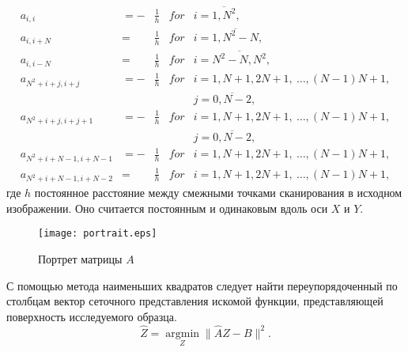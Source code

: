 \documentclass{beamer}
\begin{document}
\begin{frame}[c,allowframebreaks]
    \framebreak

    \small
    \begin{equation*}
        \begin{array}{lllll}
            a_{i,i}             & = -&\frac{1}{h} & for & i = \overline{1,N^2},                         \\
            a_{i,i+N}           & = &\frac{1}{h}  & for & i = \overline{1,N^2 - N},                     \\
            a_{i,i-N}           & = &\frac{1}{h}  & for & i = \overline{N^2 - N,N^2 },                  \\
            a_{N^2+i+j, i+j}    & = -&\frac{1}{h} & for & i = 1, N+1, 2N+1,~\dots, (N-1)N + 1,          \\
                                &   &       &   & j = \overline{0,N-2},                         \\
            a_{N^2+i+j, i+j+1}  & = -&\frac{1}{h} & for & i = 1, N+1, 2N+1,~\dots, (N-1)N + 1,          \\
                                &   &       &   & j = \overline{0,N-2},                         \\
            a_{N^2+i+N-1, i+N-1} &= -&\frac{1}{h} & for & i = 1, N+1, 2N+1,~\dots, (N-1)N + 1,          \\
            a_{N^2+i+N-1, i+N-2} &= &\frac{1}{h}  & for & i = 1, N+1, 2N+1,~\dots, (N-1)N + 1,
        \end{array}
    \end{equation*}
    где $h$ постоянное расстояние между смежными точками сканирования в исходном изображении.
    Оно считается постоянным и одинаковым вдоль оси $X$ и $Y$.
    \normalsize

    \framebreak
    \begin{figure}
        \texttt{[image: portrait.eps]}
        \caption{Портрет матрицы $A$}
    \end{figure}

    \framebreak

    С помощью метода наименьших квадратов следует найти переупорядоченный по столбцам вектор
    сеточного представления искомой функции, представляющей поверхность исследуемого образца.
    \begin{equation*}
        \hat{Z} = \operatorname{argmin}\limits_Z \|\hat{A} Z - B\|^2.
    \end{equation*}

\end{frame}
\end{document}
